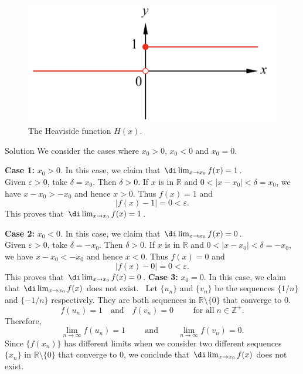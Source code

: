  \begin{figure}[ht]
\centering
\includegraphics[scale=0.2]{Picture6.png}
\caption{  The Heaviside function $H(x)$.}\label{figure6}
\end{figure}


 \begin{solution}{Solution}
 We consider the cases where $x_0>0$, $x_0<0$ and $x_0=0$.
 
  \textbf{Case 1:} $x_0>0$.
 In this case, we claim that $\di\lim_{x\rightarrow x_0}f(x)=1$. \\Given $\varepsilon>0$, take $\delta=x_0$. Then $\delta>0$. If $x$ is in $\mathbb{R}$ and $0<|x-x_0|<\delta=x_0$, we have
 $x-x_0>-x_0$ and hence $x>0$. Thus $f(x)=1$ and 
 \[|f(x)-1|=0<\varepsilon.\]
 This proves that  $\di\lim_{x\rightarrow x_0}f(x)=1$.
 
 \textbf{Case 2:} $x_0<0$.
 In this case, we claim that $\di\lim_{x\rightarrow x_0}f(x)=0$. \\Given $\varepsilon>0$, take $\delta=-x_0$. Then $\delta>0$. If $x$ is in $\mathbb{R}$ and $0<|x-x_0|<\delta=-x_0$, we have
 $x-x_0<-x_0$ and hence $x<0$. Thus $f(x)=0$ and 
 \[|f(x)-0|=0<\varepsilon.\]
 This proves that  $\di\lim_{x\rightarrow x_0}f(x)=0$. 
 \bs
  \textbf{Case 3:} $x_0=0$.
 In this case, we claim that $\di\lim_{x\rightarrow x_0}f(x)$ does not exist. \
 Let $\{u_n\}$ and $\{v_n\}$ be the sequences $\{1/n\}$ and $\{-1/n\}$ respectively. They are both sequences in $\mathbb{R}\setminus\{0\}$ that converge to 0.
 \[f(u_n)=1 \quad\text{and}\quad f(v_n)=0 \hspace{1cm}\text{for all}\;n\in\mathbb{Z}^+.\]
 Therefore,
 \[\lim_{n\rightarrow\infty}f(u_n)=1\hspace{1cm}\text{and}\hspace{1cm}\lim_{n\rightarrow\infty}f(v_n)=0.\]
 Since $\{f(x_n)\}$ has different limits when we consider two different sequences $\{x_n\}$ in $\mathbb{R}\setminus\{0\}$ that converge to 0, we conclude that   $\di\lim_{x\rightarrow x_0}f(x)$ does not exist. 
 \end{solution}
 
